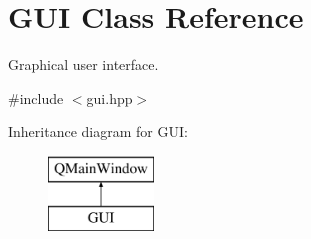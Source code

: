 \hypertarget{classGUI}{}\section{G\+UI Class Reference}
\label{classGUI}


Graphical user interface.  




{\ttfamily \#include $<$gui.\+hpp$>$}

Inheritance diagram for G\+UI\+:\begin{figure}[H]
\begin{center}
\leavevmode
\includegraphics[height=2.000000cm]{classGUI}
\end{center}
\end{figure}

